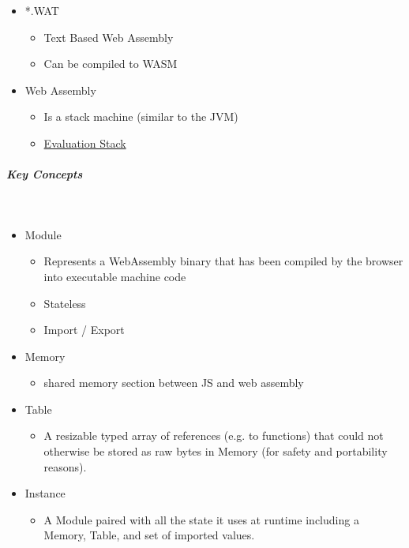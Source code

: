 \documentclass[11pt,twoside,landscape]{article}
\begin{document}
\begin{multicols}{3}
\begin{itemize}
\item *.WAT
\begin{itemize}
\item Text Based Web Assembly
\item Can be compiled to WASM
\end{itemize}

\item Web Assembly
\begin{itemize}
\item Is a stack machine (similar to the JVM)
\item \href{../../../roam/20221230171752-what_is_a_evaluation_stack.org}{Evaluation Stack}
\end{itemize}
\end{itemize}
\subparagraph{Key Concepts} \
\label{sec:org892fe45}
\begin{itemize}
\item Module
\begin{itemize}
\item Represents a WebAssembly binary that has been compiled by the browser into executable machine code
\item Stateless
\item Import / Export
\end{itemize}
\item Memory
\begin{itemize}
\item shared memory section between JS and web assembly
\end{itemize}
\item Table
\begin{itemize}
\item A resizable typed array of references (e.g. to functions) that could not otherwise be stored as raw bytes in Memory (for safety and portability reasons).
\end{itemize}
\item Instance
\begin{itemize}
\item A Module paired with all the state it uses at runtime including a Memory, Table, and set of imported values.
\end{itemize}
\end{itemize}


\end{multicols}
\end{document}
